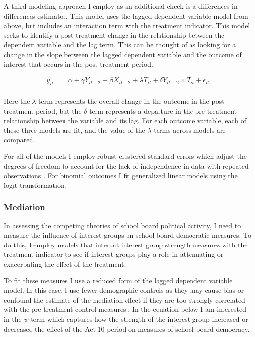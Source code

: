 A third modeling approach I employ as an additional check is a 
differences-in-differences estimator. This model uses the lagged-dependent variable 
model from above, but includes an interaction term with the treatment indicator. 
This model seeks to identify a post-treatment change in the relationship between 
the dependent variable and the lag term. This can be thought of as looking for 
a change in the slope between the lagged dependent variable and the outcome of 
interest that occurs in the post-treatment period. 

\begin{align*} 
y_{it} &= \alpha + \gamma Y_{it-2} + \beta X_{it-2} + \lambda T_{it} + \delta Y_{it-2}  \times T_{it} +\epsilon_{it}  \\ 
\end{align*}

Here the $\lambda$ term represents the overall change in the outcome in the 
post-treatment period, but the $\delta$ term represents a departure in the 
pre-treatment relationship between the variable and its lag. For each outcome 
variable, each of these three models are fit, and the value of the $\lambda$ 
terms across models are compared. 

For all of the models I employ robust clustered standard errors which adjust 
the degrees of freedom to account for the lack of independence in data with 
repeated observations \citep{woolridge}. For binomial outcomes I fit generalized 
linear models using the logit transformation. 


\subsubsection{Mediation}

In assessing the competing theories of school board political activity, I need 
to measure the influence of interest groups on school board democratic measures. 
To do this, I employ models that interact interest group strength measures with 
the treatment indicator to see if interest groups play a role in attenuating or 
exacerbating the effect of the treatment. 

To fit these measures I use a reduced form of the lagged dependent variable model. 
In this case, I use fewer demographic controls as they may cause bias or 
confound the estimate of the mediation effect if they are too strongly correlated 
with the pre-treatment control measures \citep{gelhill}. In 
the equation below I am interested in the $\psi$ term which captures how the 
strength of the interest group increased or decreased the effect of the Act 10 
period on measures of school board democracy. 

